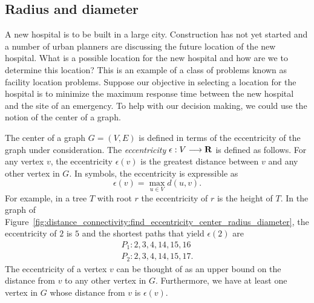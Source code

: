
\subsection{Radius and diameter}

A new hospital is to be built in a large city. Construction has not
yet started and a number of urban planners are discussing the future
location of the new hospital. What is a possible location for the new
hospital and how are we to determine this location? This is an example
of a class of problems known as facility location problems. Suppose
our objective in selecting a location for the hospital is to minimize
the maximum response time between the new hospital and the site of an
emergency. To help with our decision making, we could use the notion
of the center of a graph.

The center of a graph $G = (V,E)$ is defined in terms of the
eccentricity of the graph under consideration. The
\emph{eccentricity}
$\epsilon: V \longrightarrow \mathbf{R}$\index{$\epsilon$} is defined as follows. For any
vertex $v$, the eccentricity $\epsilon(v)$ is the greatest distance
between $v$ and any other vertex in $G$. In symbols, the eccentricity
is expressible as
\[
\epsilon(v)
=
\max_{u \in V} d(u,v).
\]
For example, in a tree $T$ with root $r$ the eccentricity of $r$ is
the height of $T$. In the graph of
Figure~\ref{fig:distance_connectivity:find_eccentricity_center_radius_diameter},
the eccentricity of $2$ is $5$ and the shortest paths that yield
$\epsilon(2)$ are
\begin{align*}
P_1: 2, 3, 4, 14, 15, 16 \\
P_2: 2, 3, 4, 14, 15, 17.
\end{align*}
The eccentricity of a vertex $v$ can be thought of as an upper bound
on the distance from $v$ to any other vertex in $G$. Furthermore, we
have at least one vertex in $G$ whose distance from $v$ is
$\epsilon(v)$.


